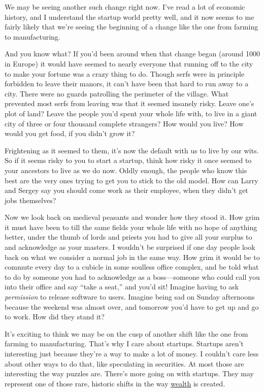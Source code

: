 We may be seeing another such change right now. I've read a lot of
economic history, and I understand the startup world pretty well, and it
now seems to me fairly likely that we're seeing the beginning of a
change like the one from farming to manufacturing.

And you know what? If you'd been around when that change began (around
1000 in Europe) it would have seemed to nearly everyone that running off
to the city to make your fortune was a crazy thing to do. Though serfs
were in principle forbidden to leave their manors, it can't have been
that hard to run away to a city. There were no guards patrolling the
perimeter of the village. What prevented most serfs from leaving was
that it seemed insanely risky. Leave one's plot of land? Leave the
people you'd spent your whole life with, to live in a giant city of
three or four thousand complete strangers? How would you live? How would
you get food, if you didn't grow it?

Frightening as it seemed to them, it's now the default with us to live
by our wits. So if it seems risky to you to start a startup, think how
risky it once seemed to your ancestors to live as we do now. Oddly
enough, the people who know this best are the very ones trying to get
you to stick to the old model. How can Larry and Sergey say you should
come work as their employee, when they didn't get jobs themselves?

Now we look back on medieval peasants and wonder how they stood it. How
grim it must have been to till the same fields your whole life with no
hope of anything better, under the thumb of lords and priests you had to
give all your surplus to and acknowledge as your masters. I wouldn't be
surprised if one day people look back on what we consider a normal job
in the same way. How grim it would be to commute every day to a cubicle
in some soulless office complex, and be told what to do by someone you
had to acknowledge as a boss---someone who could call you into their
office and say ``take a seat,'' and you'd sit! Imagine having to ask
\emph{permission} to release software to users. Imagine being sad on
Sunday afternoons because the weekend was almost over, and tomorrow
you'd have to get up and go to work. How did they stand it?

It's exciting to think we may be on the cusp of another shift like the
one from farming to manufacturing. That's why I care about startups.
Startups aren't interesting just because they're a way to make a lot of
money. I couldn't care less about other ways to do that, like
speculating in securities. At most those are interesting the way puzzles
are. There's more going on with startups. They may represent one of
those rare, historic shifts in the way \href{wealth.html}{wealth} is
created.

